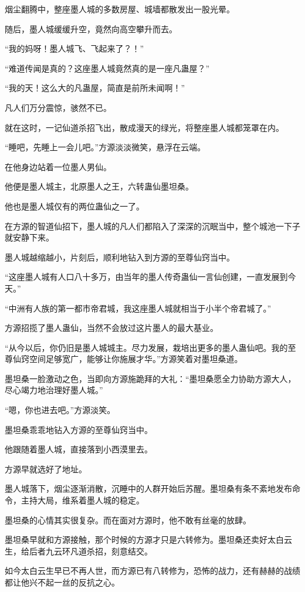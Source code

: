 \begin{this_body}
烟尘翻腾中，整座墨人城的多数房屋、城墙都散发出一股光晕。

随后，墨人城缓缓升空，竟然向高空攀升而去。

“我的妈呀！墨人城飞、飞起来了？！”

“难道传闻是真的？这座墨人城竟然真的是一座凡蛊屋？”

“我的天！这么大的凡蛊屋，简直是前所未闻啊！”

凡人们万分震惊，骇然不已。

就在这时，一记仙道杀招飞出，散成漫天的绿光，将整座墨人城都笼罩在内。

“睡吧，先睡上一会儿吧。”方源淡淡微笑，悬浮在云端。

在他身边站着一位墨人男仙。

他便是墨人城主，北原墨人之王，六转蛊仙墨坦桑。

他也是墨人城仅有的两位蛊仙之一了。

在方源的智道仙招下，墨人城的凡人们都陷入了深深的沉眠当中，整个城池一下子就安静下来。

墨人城越缩越小，片刻后，顺利地钻入到方源的至尊仙窍当中。

“这座墨人城有人口八十多万，由当年的墨人传奇蛊仙一言仙创建，一直发展到今天。”

“中洲有人族的第一都市帝君城，我这座墨人城就相当于小半个帝君城了。”

方源招揽了墨人蛊仙，当然不会放过这片墨人的最大基业。

“从今以后，你仍旧是墨人城城主。尽力发展，栽培出更多的墨人蛊仙吧。我的至尊仙窍空间足够宽广，能够让你施展才华。”方源笑着对墨坦桑道。

墨坦桑一脸激动之色，当即向方源施跪拜的大礼：“墨坦桑愿全力协助方源大人，尽心竭力地治理好墨人城。”

“嗯，你也进去吧。”方源淡笑。

墨坦桑乖乖地钻入方源的至尊仙窍当中。

他跟随着墨人城，直接落到小西漠里去。

方源早就选好了地址。

墨人城落下，烟尘逐渐消散，沉睡中的人群开始后苏醒。墨坦桑有条不紊地发布命令，主持大局，维系着墨人城的稳定。

墨坦桑的心情其实很复杂。而在面对方源时，他不敢有丝毫的放肆。

墨坦桑早就和方源接触，那个时候的方源才只是六转修为。墨坦桑还卖好太白云生，给后者九云环凡道杀招，刻意结交。

如今太白云生早已不再人世，而方源已有八转修为，恐怖的战力，还有赫赫的战绩都让他兴不起一丝的反抗之心。


\end{this_body}
